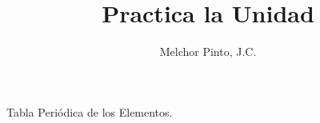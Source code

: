 \documentclass[12pt,addpoints,answers]{repaso}
\title{Practica la Unidad}
\author{Melchor Pinto, J.C.}
\begin{document}
\INFO
\ejemplosboxed[]
\begin{questions}
    \questionboxed[5]{}
    \questionboxed[5]{}
    \begin{multicols}{2}
    \ejemplosboxed[]
    \ejemplosboxed[]
    \end{multicols}
    
    \begin{multicols}{2}
        \questionboxed[5]{}
        \questionboxed[5]{}
    \end{multicols}
    \questionboxed[5]{}

    \questionboxed[5]{}
    \questionboxed[5]{}
    \questionboxed[5]{}
    \questionboxed[5]{}

    \questionboxed[5]{}

    \questionboxed[10]{}
    \questionboxed[10]{}
    \questionboxed[5]{}
    \questionboxed[5]{}

    \questionboxed[5]{}

    \questionboxed[10]{}
    \questionboxed[10]{}
    \newpage
    \questionboxed[5]{}


\end{questions}
\begin{landscape}
    \begin{minipage}[b]{\textwidth}
        \thispagestyle{foot}
        \begin{table}[H]
            \centering
            \caption{Tabla Peri\'odica de los Elementos.}
            \TablaPeriodica[0.48]
            \label{tab:periodic_table}
        \end{table}
    \end{minipage}
\end{landscape}
\end{document}
